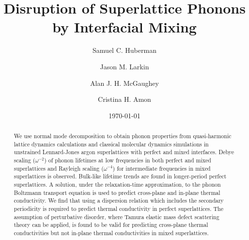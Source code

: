 \documentclass[aps,prb,preprint,preprintnumbers,amsmath,amssymb,floatfix,superscriptaddress]{revtex4}
\begin{document}
\title{Disruption of Superlattice Phonons by Interfacial Mixing}
\author{Samuel C. Huberman}
\author{Jason M. Larkin}
\author{Alan J. H. McGaughey}
\author{Cristina H. Amon}

\date{\today}%
\vspace{14mm}
  
\begin{abstract}

We use normal mode decomposition to obtain phonon properties from quasi-harmonic lattice dynamics calculations and classical molecular dynamics simulations in unstrained Lennard-Jones argon superlattices with perfect and mixed interfaces. Debye scaling ($\omega^{-2}$) of phonon lifetimes at low frequencies in both perfect and mixed superlattices and Rayleigh scaling ($\omega^{-4}$) for intermediate frequencies in mixed superlattices is observed. Bulk-like lifetime trends are found in longer-period perfect superlattices. A solution, under the relaxation-time approximation, to the phonon Boltzmann transport equation is used to predict cross-plane and in-plane thermal conductivity. We find that using a dispersion relation which includes the secondary periodicity is required to predict thermal conductivity in perfect superlattices. The assumption of perturbative disorder, where Tamura elastic mass defect scattering theory can be applied, is found to be valid for predicting cross-plane thermal conductivities but not in-plane thermal conductivities in mixed superlattices. 

\end{abstract}
\maketitle
\end{document}
